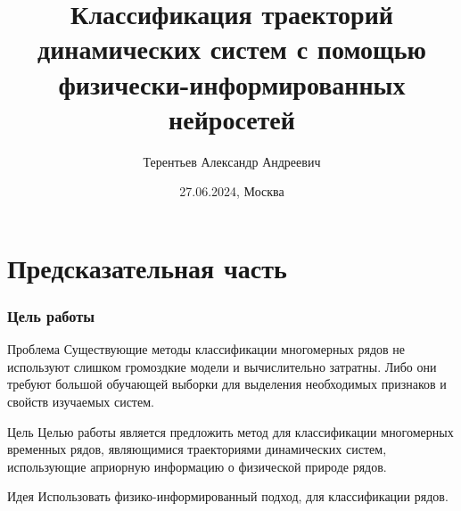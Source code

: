 \documentclass{beamer}
\title[Классификационные ФИНН] %
{Классификация траекторий динамических систем с помощью физически-информированных нейросетей}
\author[Терентьев Александр] %
{Терентьев Александр Андреевич}
\institute[MIPT] %
{
  
  Московский физико-технический институт, 
  
  Физтех-школа прикладной математики и информатики\\

  Кафедра интеллектуальных систем

  Научный руководитель: к.ф.-м.н. Исаченко Р.В.
}
\date[27.06.2024] %
{27.06.2024, Москва}
\begin{document}
\frame{\titlepage}




\section{}

\section{Предсказательная часть}

\begin{frame}
\frametitle{Цель работы}
\begin{block}{Проблема}
Существующие методы классификации многомерных рядов не используют слишком громоздкие модели и вычислительно затратны. Либо они требуют большой обучающей выборки для выделения необходимых признаков и свойств изучаемых систем. 
\end{block}
\begin{block}{Цель}
Целью работы является предложить метод для классификации многомерных временных рядов, являющимися траекториями динамических систем,  использующие априорную информацию о физической природе рядов.
\end{block}

\begin{block}{Идея}
Использовать физико-информированный подход, для классификации рядов.
\end{block}


\end{frame}
\end{document}
